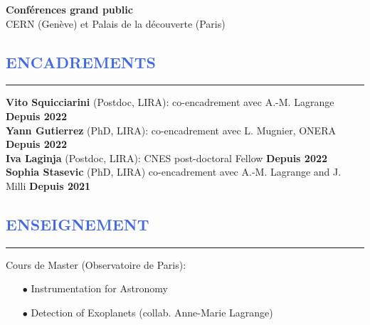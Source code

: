 \documentclass[11pt, a4paper, french]{article}
\begin{document}
\vspace{0.4cm}
\textbf{Conférences grand public}   \\
\hspace{0.3cm} CERN (Genève) et Palais de la découverte (Paris)\\



\vspace{-0.8cm}
\textcolor{RoyalBlue}{\section{\large ENCADREMENTS}
\vspace{-0.2cm}\hrule}
\vspace{0.4cm}
\textbf{Vito Squicciarini} (Postdoc, LIRA): co-encadrement avec A.-M. Lagrange \hfill \textbf{Depuis 2022}\\
\textbf{Yann Gutierrez} (PhD, LIRA): co-encadrement avec L. Mugnier, ONERA \hfill \textbf{Depuis 2022}\\
\textbf{Iva Laginja} (Postdoc, LIRA): CNES post-doctoral Fellow \hfill \textbf{Depuis 2022}\\
\textbf{Sophia Stasevic} (PhD, LIRA) co-encadrement avec A.-M. Lagrange and J. Milli \hfill \textbf{Depuis 2021}\\

\vspace{-0.1cm}
\textcolor{RoyalBlue}{\section{\large ENSEIGNEMENT}
\vspace{-0.2cm}\hrule}
\vspace{0.4cm}
Cours de Master (Observatoire de Paris):
\begin{itemize} \itemsep -2pt
    \item[$\bullet$] Instrumentation for Astronomy 
    \item[$\bullet$] Detection of Exoplanets (collab. Anne-Marie Lagrange)
\end{itemize}
\end{document}
